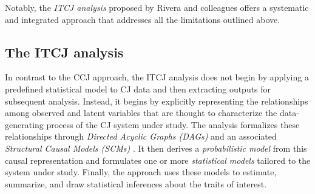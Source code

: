 \documentclass[
  authoryear,
  review,
  1p]{elsarticle}
\begin{document}
Notably, the \emph{ITCJ analysis} proposed by Rivera and colleagues
\citeyearpar{Rivera_et_al_2025} offers a systematic and integrated
approach that addresses all the limitations outlined above.

\subsection{The ITCJ analysis}\label{sec-theory_ITCJ}

In contrast to the CCJ approach, the ITCJ analysis does not begin by
applying a predefined statistical model to CJ data and then extracting
outputs for subsequent analysis. Instead, it begins by explicitly
representing the relationships among observed and latent variables that
are thought to characterize the data-generating process of the CJ system
under study. The analysis formalizes these relationships through
\emph{Directed Acyclic Graphs (DAGs)} and an associated \emph{Structural
Causal Models (SCMs)}
\citep{Morgan_et_al_2014, Gross_et_al_2018, Neal_2020}. It then derives
a \emph{probabilistic model} from this causal representation and
formulates one or more \emph{statistical models} tailored to the system
under study. Finally, the approach uses these models to estimate,
summarize, and draw statistical inferences about the traits of interest.
\end{document}
